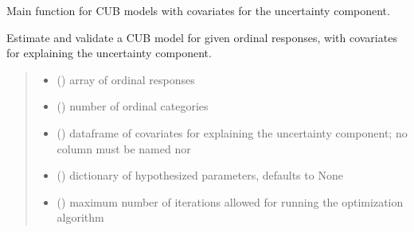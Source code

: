 \documentclass[letterpaper,10pt,english]{sphinxmanual}
\begin{document}

\begin{fulllineitems}
\label{\detokenize{cubmods:cubmods.cub_y0.mle}}
\pysigstartsignatures
{}
\pysigstopsignatures
\sphinxAtStartPar
Main function for CUB models with covariates for the uncertainty component.

\sphinxAtStartPar
Estimate and validate a CUB model for given ordinal responses, with covariates for explaining 
the uncertainty component.
\begin{quote}\begin{description}
\begin{itemize}
\item {} 
\sphinxAtStartPar
{} () \textendash{} array of ordinal responses

\item {} 
\sphinxAtStartPar
{} () \textendash{} number of ordinal categories

\item {} 
\sphinxAtStartPar
{} () \textendash{} dataframe of covariates for explaining the uncertainty component;
no column must be named  nor 

\item {} 
\sphinxAtStartPar
{} (\sphinxstyleliteralemphasis{\sphinxupquote{, }}) \textendash{} dictionary of hypothesized parameters, defaults to None

\item {} 
\sphinxAtStartPar
{} () \textendash{} maximum number of iterations allowed for running the optimization algorithm


\end{itemize}
\end{description}
\end{quote}
\end{fulllineitems}
\end{document}
